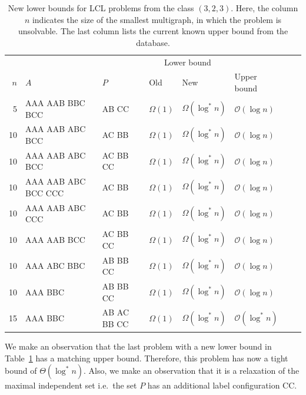 \begin{table}[H]
    \centering
    \begin{adjustbox}{width={\textwidth},keepaspectratio}%
    \begin{tabular}{rlllllll}
        \toprule
        &&& \multicolumn{2}{c}{Lower bound} \\
        \cmidrule{4-5}
        $n$ & $A$ & $P$ & Old & New & Upper bound\\
        \midrule
        5  & AAA AAB BBC BCC     & AB CC       & $\Omega(1)$ & $\Omega(\log^*n)$ & $\mathcal{O}(\log n)$\\
        10 & AAA AAB ABC BCC     & AC BB       & $\Omega(1)$ & $\Omega(\log^*n)$ & $\mathcal{O}(\log n)$\\
        10 & AAA AAB ABC BCC     & AC BB CC    & $\Omega(1)$ & $\Omega(\log^*n)$ & $\mathcal{O}(\log n)$\\
        10 & AAA AAB ABC BCC CCC & AC BB       & $\Omega(1)$ & $\Omega(\log^*n)$ & $\mathcal{O}(\log n)$\\
        10 & AAA AAB ABC CCC     & AC BB       & $\Omega(1)$ & $\Omega(\log^*n)$ & $\mathcal{O}(\log n)$\\
        10 & AAA AAB BCC         & AC BB CC    & $\Omega(1)$ & $\Omega(\log^*n)$ & $\mathcal{O}(\log n)$\\
        10 & AAA ABC BBC         & AB BB CC    & $\Omega(1)$ & $\Omega(\log^*n)$ & $\mathcal{O}(\log n)$\\
        10 & AAA BBC             & AB BB CC    & $\Omega(1)$ & $\Omega(\log^*n)$ & $\mathcal{O}(\log n)$\\
        15 & AAA BBC             & AB AC BB CC & $\Omega(1)$ & $\Omega(\log^*n)$ & $\mathcal{O}(\log^* n)$\\
        \bottomrule
    \end{tabular}
    \end{adjustbox}
    \caption{%
    New lower bounds for LCL problems from the class $(3,2,3)$.
    Here, the column $n$ indicates the size of the smallest multigraph, in which the problem is unsolvable.
    The last column lists the current known upper bound from the database.
    }
    \label{tbl:results:asd2}
\end{table}
We make an observation that the last problem with a new lower bound in Table~\ref{tbl:results:asd2} has a matching upper bound.
Therefore, this problem has now a tight bound of $\Theta(\log^* n)$.
Also, we make an observation that it is a relaxation of the maximal independent set i.e.\ the set $P$ has an additional label configuration CC.


